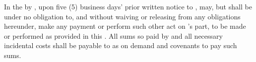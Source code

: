 \label{sec:default-perform}
In the \eventOfDefault by \lessee, upon five (5) business days' prior written notice to \lessee, \lessor may, but shall be under no obligation to, and without waiving or releasing \lessee from any obligations hereunder, make any payment or perform such other act on \lessee's part, to be made or performed as provided in this \lease. All sums so paid by \lessor and all necessary incidental costs shall be payable to \lessor as \additionalRent on demand and \lessee covenants to pay such sums.

